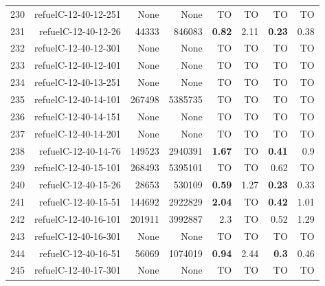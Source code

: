 \begin{longtable}{lrr@{\hskip 12pt}r@{\hskip 12pt}r@{\hskip 12pt}r@{\hskip 12pt}r@{\hskip 12pt}r}
230 & \multirow{1}{*}{refuelC-12-40-12-251} & \multirow{1}{*}{None} & \multirow{1}{*}{None} & TO & TO & TO & TO \\
231 & \multirow{1}{*}{refuelC-12-40-12-26} & \multirow{1}{*}{44333} & \multirow{1}{*}{846083} & \textbf{0.82} & 2.11 & \textbf{0.23} & 0.38 \\
232 & \multirow{1}{*}{refuelC-12-40-12-301} & \multirow{1}{*}{None} & \multirow{1}{*}{None} & TO & TO & TO & TO \\
233 & \multirow{1}{*}{refuelC-12-40-12-401} & \multirow{1}{*}{None} & \multirow{1}{*}{None} & TO & TO & TO & TO \\
234 & \multirow{1}{*}{refuelC-12-40-13-251} & \multirow{1}{*}{None} & \multirow{1}{*}{None} & TO & TO & TO & TO \\
235 & \multirow{1}{*}{refuelC-12-40-14-101} & \multirow{1}{*}{267498} & \multirow{1}{*}{5385735} & TO & TO & TO & TO \\
236 & \multirow{1}{*}{refuelC-12-40-14-151} & \multirow{1}{*}{None} & \multirow{1}{*}{None} & TO & TO & TO & TO \\
237 & \multirow{1}{*}{refuelC-12-40-14-201} & \multirow{1}{*}{None} & \multirow{1}{*}{None} & TO & TO & TO & TO \\
238 & \multirow{1}{*}{refuelC-12-40-14-76} & \multirow{1}{*}{149523} & \multirow{1}{*}{2940391} & \textbf{1.67} & TO & \textbf{0.41} & 0.9 \\
239 & \multirow{1}{*}{refuelC-12-40-15-101} & \multirow{1}{*}{268493} & \multirow{1}{*}{5395101} & TO & TO & 0.62 & TO \\
240 & \multirow{1}{*}{refuelC-12-40-15-26} & \multirow{1}{*}{28653} & \multirow{1}{*}{530109} & \textbf{0.59} & 1.27 & \textbf{0.23} & 0.33 \\
241 & \multirow{1}{*}{refuelC-12-40-15-51} & \multirow{1}{*}{144692} & \multirow{1}{*}{2922829} & \textbf{2.04} & TO & \textbf{0.42} & 1.01 \\
242 & \multirow{1}{*}{refuelC-12-40-16-101} & \multirow{1}{*}{201911} & \multirow{1}{*}{3992887} & 2.3 & TO & 0.52 & 1.29 \\
243 & \multirow{1}{*}{refuelC-12-40-16-301} & \multirow{1}{*}{None} & \multirow{1}{*}{None} & TO & TO & TO & TO \\
244 & \multirow{1}{*}{refuelC-12-40-16-51} & \multirow{1}{*}{56069} & \multirow{1}{*}{1074019} & \textbf{0.94} & 2.44 & \textbf{0.3} & 0.46 \\
245 & \multirow{1}{*}{refuelC-12-40-17-301} & \multirow{1}{*}{None} & \multirow{1}{*}{None} & TO & TO & TO & TO \\

\end{longtable}
